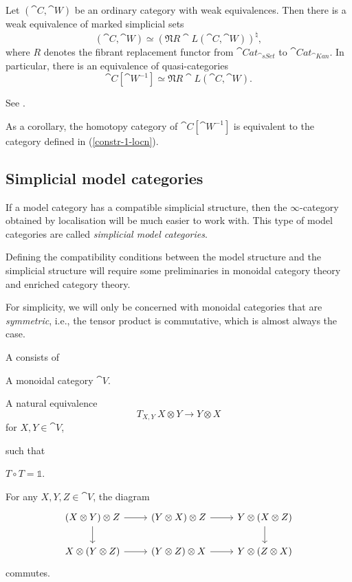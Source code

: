 \begin{theorem}
    Let $(\cat{C},\cat{W})$ be an ordinary category with weak equivalences.
    Then there is a weak equivalence of marked simplicial sets 
    \[ (\cat{C},\cat{W}) \simeq (\mathfrak{N}R\cat{L}(\cat{C},\cat{W}))^\natural, \]
    where $R$ denotes the fibrant replacement functor
    from $\cat{Cat}_{\cat{sSet}}$ to $\cat{Cat}_{\cat{Kan}}$.
    In particular, there is an equivalence of quasi-categories
    \[ \cat{C}[\cat{W}^{-1}] \simeq \mathfrak{N}R\cat{L}(\cat{C},\cat{W}). \]
\end{theorem}

See \cite[\S1.2]{hinich13}.

As a corollary, the homotopy category of $\cat{C}[\cat{W}^{-1}]$
is equivalent to the category defined in (\ref{constr-1-locn}).

\subsection{Simplicial model categories}

If a model category has a compatible simplicial structure,
then the $\infty$-category obtained by localisation
will be much easier to work with.
This type of model categories are called \emph{simplicial model categories}.

Defining the compatibility conditions between the model structure
and the simplicial structure will require some
preliminaries in monoidal category theory and enriched category theory.

For simplicity, we will only be concerned with
monoidal categories that are \emph{symmetric},
i.e., the tensor product is commutative,
which is almost always the case.

\begin{definition}
    A  consists of
    \begin{itms}
        \item A monoidal category $\cat{V}$.
        \item A natural equivalence
        \[ T_{X,Y} \: X \otimes Y \to Y \otimes X \]
        for $X,Y \in \cat{V}$,
    \end{itms}
    such that
    \begin{itms}
        \item $T \circ T = \mathbb{1}$.
        \item For any $X,Y,Z \in \cat{V}$, the diagram
        \[ \begin{tikzcd}
            (X\otimes Y)\otimes Z\ar[r]\ar[d] &
            (Y\otimes X)\otimes Z\ar[r] &
            Y\otimes(X\otimes Z)\ar[d] \\
            X\otimes(Y\otimes Z)\ar[r] &
            (Y\otimes Z)\otimes X\ar[r] &
            Y\otimes(Z\otimes X)
        \end{tikzcd} \]
        commutes.
    \end{itms}
\end{definition}

